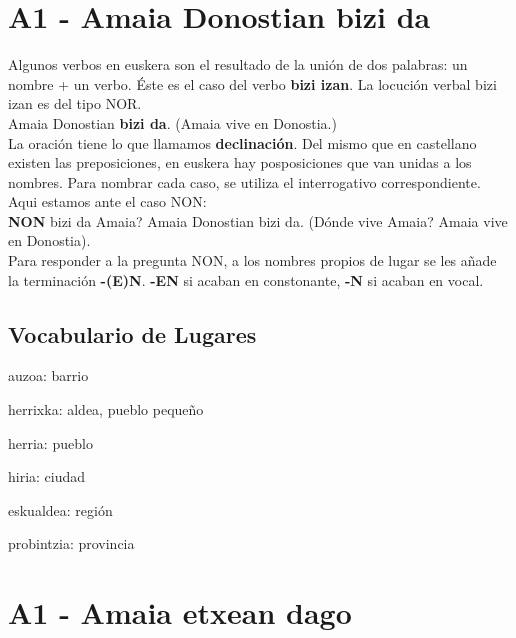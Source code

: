 \documentclass[11pt, a4paper]{article}
\begin{document}
\section{A1 - Amaia Donostian bizi da}
Algunos verbos en euskera son el resultado de la unión de dos palabras: un nombre + un verbo. Éste es el caso del verbo \textbf{bizi izan}. La locución verbal bizi izan es del tipo NOR.\\
\indent Amaia Donostian \textbf{bizi da}. (Amaia vive en Donostia.)\\

\noindent La oraci\'on tiene lo que llamamos \textbf{declinaci\'on}. Del mismo que en castellano existen las preposiciones, en euskera hay posposiciones que van unidas a los nombres. Para nombrar cada caso, se utiliza el interrogativo correspondiente. Aqui estamos ante el caso NON:\\
\indent \textbf{NON} bizi da Amaia? Amaia Donostian bizi da. (D\'onde vive Amaia? Amaia vive en Donostia).\\

\noindent Para responder a la pregunta NON, a los nombres propios de lugar se les a\~nade la terminaci\'on \textbf{-(E)N}. \textbf{-EN} si acaban en constonante, \textbf{-N} si acaban en vocal.\\

\subsection{Vocabulario de Lugares}
\begin{itemize}
\begin{multicols}{2}
\item auzoa: barrio
\item herrixka: aldea, pueblo pequeño
\item herria: pueblo
\item hiria: ciudad
\item eskualdea: región
\item probintzia: provincia
\end{multicols}
\end{itemize}

\section{A1 - Amaia etxean dago}
\end{document}
